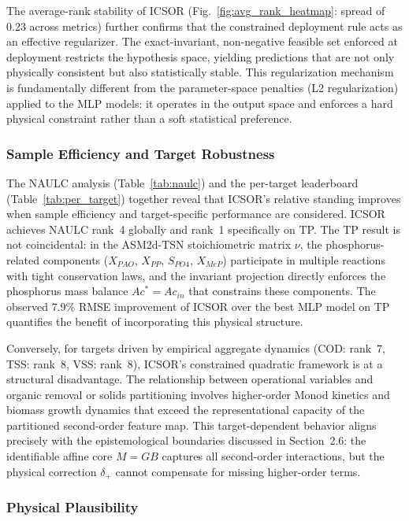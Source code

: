 \documentclass[11pt]{article}
\begin{document}
The average-rank stability of ICSOR (Fig.~\ref{fig:avg_rank_heatmap}: spread of 0.23 across metrics) further confirms that the constrained deployment rule acts as an effective regularizer. The exact-invariant, non-negative feasible set enforced at deployment restricts the hypothesis space, yielding predictions that are not only physically consistent but also statistically stable. This regularization mechanism is fundamentally different from the parameter-space penalties (L2 regularization) applied to the MLP models: it operates in the output space and enforces a hard physical constraint rather than a soft statistical preference.

\subsubsection{Sample Efficiency and Target Robustness}

The NAULC analysis (Table~\ref{tab:naulc}) and the per-target leaderboard (Table~\ref{tab:per_target}) together reveal that ICSOR's relative standing improves when sample efficiency and target-specific performance are considered. ICSOR achieves NAULC rank~4 globally and rank~1 specifically on TP. The TP result is not coincidental: in the ASM2d-TSN stoichiometric matrix $\nu$, the phosphorus-related components ($X_{PAO}$, $X_{PP}$, $S_{PO4}$, $X_{MeP}$) participate in multiple reactions with tight conservation laws, and the invariant projection directly enforces the phosphorus mass balance $Ac^* = Ac_{in}$ that constrains these components. The observed 7.9\% RMSE improvement of ICSOR over the best MLP model on TP quantifies the benefit of incorporating this physical structure.

Conversely, for targets driven by empirical aggregate dynamics (COD: rank~7, TSS: rank~8, VSS: rank~8), ICSOR's constrained quadratic framework is at a structural disadvantage. The relationship between operational variables and organic removal or solids partitioning involves higher-order Monod kinetics and biomass growth dynamics that exceed the representational capacity of the partitioned second-order feature map. This target-dependent behavior aligns precisely with the epistemological boundaries discussed in Section~2.6: the identifiable affine core $M = GB$ captures all second-order interactions, but the physical correction $\delta_+$ cannot compensate for missing higher-order terms.

\subsubsection{Physical Plausibility}
\end{document}
